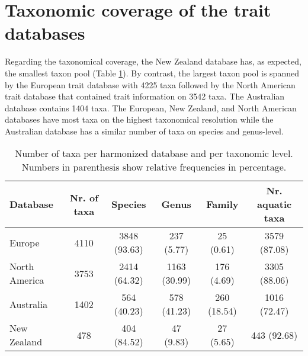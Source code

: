 \documentclass[../Draft_harmonization_paper.tex]{subfiles}
\begin{document}
\section{Taxonomic coverage of the trait databases}

Regarding the taxonomical coverage, the New Zealand database has, as expected, the smallest taxon pool (Table \ref{tab:tax_coverage}). By contrast, the largest taxon pool is spanned by the European trait database with 4225 taxa followed by the North American trait database that contained trait information on 3542 taxa. The Australian database contains 1404 taxa. The European, New Zealand, and North American databases have most taxa on the highest taxonomical resolution while the Australian database has a similar number of taxa on species and genus-level.


\begin{table}[ht]
    \centering
    \caption{Number of taxa per harmonized database and per taxonomic level. Numbers in parenthesis show relative frequencies in percentage.}
    \label{tab:tax_coverage}
    \begin{tabular}{lccccc}
    \hline
    Database & Nr. of taxa & Species & Genus & Family & Nr. aquatic taxa \\ 
    \hline
    Europe & 4110 & 3848 (93.63) & 237 (5.77) & 25 (0.61) & 3579 (87.08) \\ 
      North America & 3753 & 2414 (64.32) & 1163 (30.99) & 176 (4.69) & 3305 (88.06) \\ 
      Australia & 1402 & 564 (40.23) & 578 (41.23) & 260 (18.54) & 1016 (72.47) \\ 
      New Zealand & 478 & 404 (84.52) & 47 (9.83) & 27 (5.65) & 443 (92.68) \\ 
    \hline
    \end{tabular}
\end{table}
\end{document}
